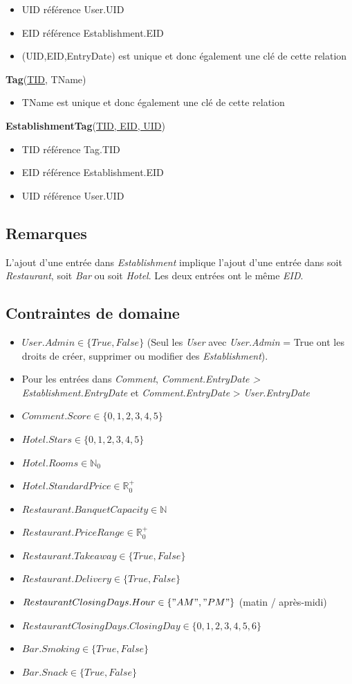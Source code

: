 \documentclass[11pt,a4paper]{report}
\begin{document}
\begin{itemize}
\item UID référence User.UID
\item EID référence Establishment.EID
\item (UID,EID,EntryDate) est unique et donc également une clé de cette relation\\
\end{itemize}
\textbf{Tag}(\underline{TID}, TName)
\begin{itemize}
\item TName est unique et donc également une clé de cette relation\\
\end{itemize}
\textbf{EstablishmentTag}(\underline{TID, EID, UID})
\begin{itemize}
\item TID référence Tag.TID
\item EID référence Establishment.EID
\item UID référence User.UID
\end{itemize}
\subsection*{Remarques}
L'ajout d'une entrée dans \textit{Establishment} implique l'ajout d'une entrée dans soit \textit{Restaurant}, soit \textit{Bar} ou soit \textit{Hotel}. Les deux entrées ont le même \textit{EID}.
\subsection*{Contraintes de domaine}
\begin{itemize}
\item $User.Admin \in \{True,False\} $ (Seul les \textit{User} avec \textit{User.Admin} = True ont les droits de créer, supprimer ou modifier des \textit{Establishment}).
\item Pour les entrées dans \textit{Comment}, \textit{Comment.EntryDate > Establishment.EntryDate} et \textit{Comment.EntryDate} > \textit{User.EntryDate}
\item $Comment.Score \in \{0,1,2,3,4,5\}$
\item $Hotel.Stars \in \{0,1,2,3,4,5\}$
\item $Hotel.Rooms \in \mathbb{N}_{0}$
\item $Hotel.StandardPrice \in \mathbb{R}^{+}_{0}$
\item $Restaurant.BanquetCapacity \in \mathbb{N} $
\item $Restaurant.PriceRange \in \mathbb{R}^{+}_{0} $
\item $Restaurant.Takeaway \in \{True,False\} $
\item $Restaurant.Delivery \in \{True,False\} $
\item $RestaurantClosingDays.Hour \in \{"AM","PM"\}$ (matin / après-midi)
\item $RestaurantClosingDays.ClosingDay \in \{0,1,2,3,4,5,6\}$
\item $Bar.Smoking \in \{True,False\} $
\item $Bar.Snack \in \{True,False\} $
\end{itemize}
\end{document}
